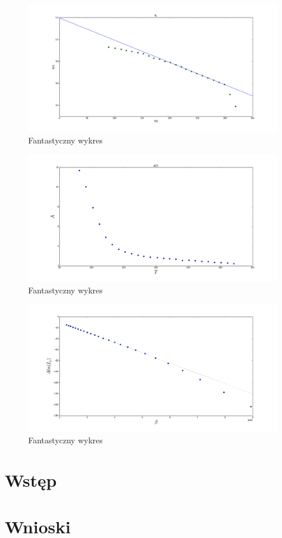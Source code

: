 \documentclass[a4paper,12pt]{article}
\begin{document}
\begin{figure} [H]
  \begin{center}
    \includegraphics[width = 15cm]{probka2_phi_b.png}
    \caption{Fantastyczny wykres}
  \end{center}
\end{figure}


\begin{figure} [H]
  \begin{center}
    \includegraphics[width = 15cm]{A_T.png}
    \caption{Fantastyczny wykres}
  \end{center}
\end{figure}

\begin{figure} [H]
  \begin{center}
    \includegraphics[width = 15cm]{A_lnI.png}
    \caption{Fantastyczny wykres}
  \end{center}
\end{figure}
\section{Wstęp}

\section{Wnioski}
\end{document}
